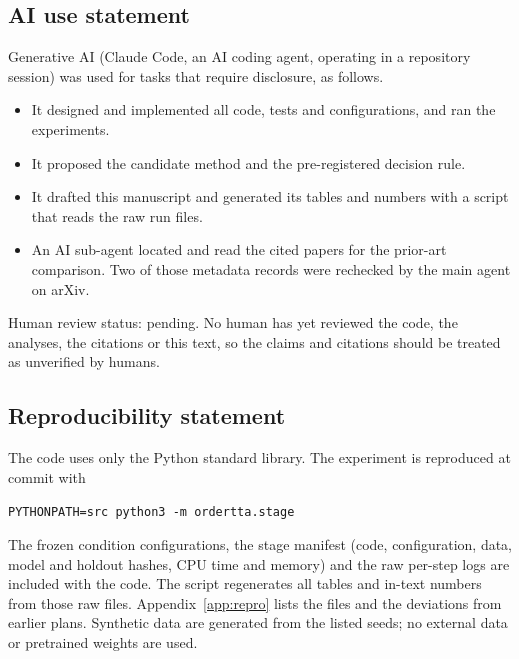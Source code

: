\subsection*{AI use statement}
Generative AI (Claude Code, an AI coding agent, operating in a repository session) was used for tasks that
require disclosure, as follows.
\begin{itemize}
\item It designed and implemented all code, tests and configurations, and ran the experiments.
\item It proposed the candidate method and the pre-registered decision rule.
\item It drafted this manuscript and generated its tables and numbers with a script that reads the raw run
files.
\item An AI sub-agent located and read the cited papers for the prior-art comparison. Two of those metadata
records were rechecked by the main agent on arXiv.
\end{itemize}
Human review status: pending. No human has yet reviewed the code, the analyses, the citations or this
text, so the claims and citations should be treated as unverified by humans.

\subsection*{Reproducibility statement}
The code uses only the Python standard library. The experiment is reproduced at commit
\texttt{} with
\begin{center}
\small\texttt{PYTHONPATH=src python3 -m ordertta.stage}\\
\small{}
\end{center}
The frozen condition configurations, the stage manifest (code, configuration,
data, model and holdout hashes, CPU time and memory) and the raw per-step logs are included with the code.
The script  regenerates all tables and in-text numbers from those raw
files. Appendix~\ref{app:repro} lists the files and the deviations from earlier plans. Synthetic data are
generated from the listed seeds; no external data or pretrained weights are used.
